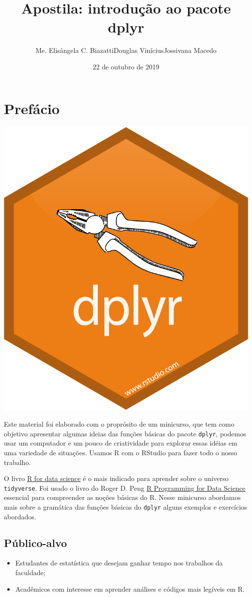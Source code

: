 \documentclass[]{book}
\title{Apostila: introdução ao pacote dplyr}
\author{Me. Elisângela C. BiazattiDouglas ViníciusJossivana Macedo}
\date{22 de outubro de 2019}
\providecommand{\tightlist}{%
  \setlength{\itemsep}{0pt}\setlength{\parskip}{0pt}}
\begin{document}
\maketitle

{
\setcounter{tocdepth}{1}
\tableofcontents
}
\hypertarget{prefuxe1cio}{%
\chapter{Prefácio}\label{prefuxe1cio}}

\begin{center}\includegraphics[width=0.3\linewidth]{imagens/dplyr} \end{center}

Este material foi elaborado com o proprósito de um minicurso, que tem como objetivo apresentar algumas ideias das funções básicas do pacote \texttt{dplyr}, podemos usar um computador e um pouco de criatividade para explorar essas idéias em uma variedade de situações. Usamos R com o RStudio para fazer todo o nosso trabalho.

O livro \href{https://r4ds.had.co.nz/}{R for data science} é o mais indicado para aprender sobre o universo \texttt{tidyverse}. Foi usado o livro do Roger D. Peng \href{https://bookdown.org/rdpeng/rprogdatascience/}{R Programming for Data Science} essencial para compreender as noções básicas do R. Nesse minicurso abordamos mais sobre a gramática das funções básicas do \texttt{dplyr} alguns exemplos e exercícios abordados.

\hypertarget{puxfablico-alvo}{%
\section{Público-alvo}\label{puxfablico-alvo}}

\begin{itemize}
\tightlist
\item
  Estudantes de estatística que desejam ganhar tempo nos trabalhos da faculdade;
\item
  Acadêmicos com interesse em aprender análises e códigos mais legíveis em R.
\end{itemize}
\end{document}

